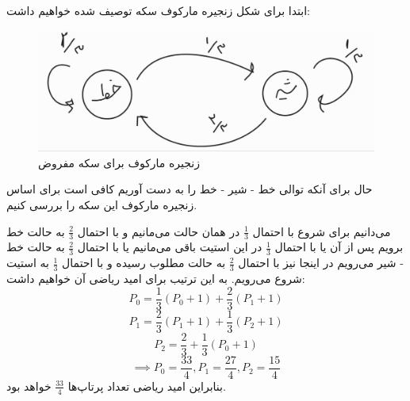 ابتدا برای شکل زنجیره مارکوف سکه توصیف شده خواهیم داشت:
\begin{figure}[h]
    \centering
    \includegraphics[scale = 0.3]{"commons/third.jpg"}
    \caption{زنجیره مارکوف برای سکه مفروض}
\end{figure}
حال برای آنکه توالی خط - شیر - خط را به دست آوریم کافی است برای اساس زنجیره مارکوف این سکه را بررسی کنیم.

می‌دانیم برای شروع با احتمال
$\frac{1}{3}$
در همان حالت می‌مانیم و با احتمال
$\frac{2}{3}$
به حالت خط برویم پس از آن یا با احتمال
$\frac{1}{3}$
در این استیت باقی می‌مانیم یا با احتمال
$\frac{2}{3}$
به حالت خط - شیر می‌رویم در اینجا نیز با احتمال
$\frac{2}{3}$
به حالت مطلوب رسیده و با احتمال
$\frac{1}{3}$
به استیت شروع می‌رویم. به این ترتیب برای امید ریاضی آن خواهیم داشت:
$$P_0 = \frac{1}{3}(P_0 + 1) + \frac{2}{3}(P_1 + 1)$$
$$P_1 = \frac{2}{3}(P_1 + 1) + \frac{1}{3}(P_2 + 1)$$
$$P_2 = \frac{2}{3} + \frac{1}{3} (P_0 + 1)$$
$$\implies P_0 = \frac{33}{4}, P_1 = \frac{27}{4}, P_2 = \frac{15}{4}$$
بنابراین امید ریاضی تعداد پرتاپ‌ها
$\frac{33}{4}$
خواهد بود.